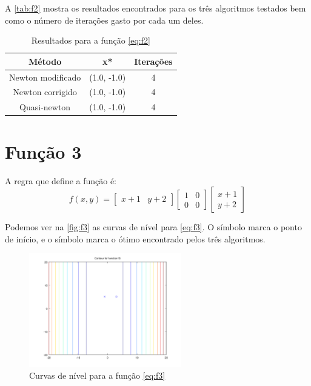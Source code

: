 \documentclass[12pt]{article}
\begin{document}
A \autoref{tab:f2} mostra os resultados encontrados para os três algoritmos testados bem como o número de iterações gasto por cada um deles.

\begin{table}[H]
\centering
\begin{tabular}{*3c}
\toprule
Método			&	x*		&	Iterações\\
\midrule
Newton modificado	&	(1.0, -1.0)	&	4\\
Newton corrigido	&	(1.0, -1.0)	&	4\\
Quasi-newton		&	(1.0, -1.0)	&	4\\
\bottomrule
\end{tabular}
\caption{\small{Resultados para a função \autoref{eq:f2} }}
\label{tab:f2}
\end{table}


\section{Função 3}
A regra que define a função é:
\begin{equation}
\label{eq:f3}
f(x, y) = 
	   \begin{bmatrix}
            x + 1 & y + 2
           \end{bmatrix}            
           \begin{bmatrix}
	   1 	& 0 \\
	   0	& 0
           \end{bmatrix} 
           \begin{bmatrix}
	   x + 1 \\
	   y + 2
           \end{bmatrix}
\end{equation}

Podemos ver na \autoref{fig:f3} as curvas de nível para \autoref{eq:f3}. O símbolo \textit{\textopenbullet} marca o ponto de início,
e o símbolo \textit{\texttimes} marca o ótimo encontrado pelos três algoritmos.

\begin{figure}[H]
  \centering
  \includegraphics[width=250px]{../matlab/images/f3_contour}
  \caption{Curvas de nível para a função \autoref{eq:f3}}
  \label{fig:f3}
\end{figure}
\end{document}
